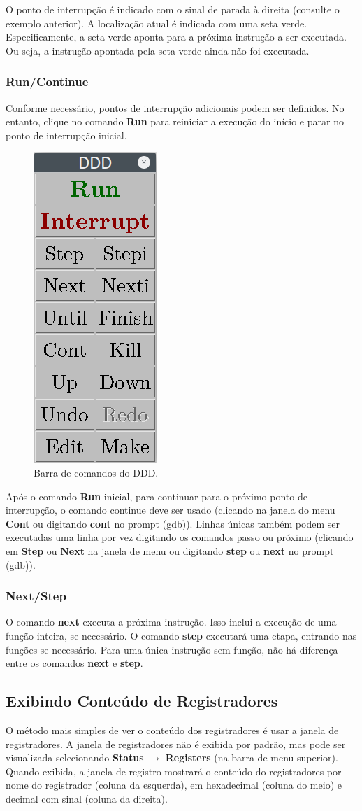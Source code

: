O ponto de interrupção é indicado com o sinal de parada à direita (consulte o exemplo anterior). A localização atual é indicada com uma seta verde. Especificamente, a seta verde aponta para a próxima instrução a ser executada. Ou seja, a instrução apontada pela seta verde ainda não foi executada.

\subsubsection{Run/Continue}
Conforme necessário, pontos de interrupção adicionais podem ser definidos. No entanto, clique no comando \textbf{Run} para reiniciar a execução do início e parar no ponto de interrupção inicial.

\begin{figure}[h]
	\begin{center}
		\includegraphics[width=0.12\linewidth]{imagens/ddd04}
	\end{center}
	\caption{Barra de comandos do DDD.}
\end{figure}

Após o comando \textbf{Run} inicial, para continuar para o próximo ponto de interrupção, o comando continue deve ser usado (clicando na janela do menu \textbf{Cont} ou digitando \textbf{cont} no prompt (gdb)). Linhas únicas também podem ser executadas uma linha por vez digitando os comandos passo ou próximo  (clicando em \textbf{Step} ou \textbf{Next} na janela de menu ou digitando \textbf{step} ou \textbf{next} no prompt (gdb)).


\subsubsection{Next/Step}
O comando \textbf{next} executa a próxima instrução. Isso inclui a execução de uma função inteira, se necessário. O comando \textbf{step} executará uma etapa, entrando nas funções se necessário. Para uma única instrução sem função, não há diferença entre os comandos \textbf{next} e \textbf{step}.

\subsection{Exibindo Conteúdo de Registradores}
O método mais simples de ver o conteúdo dos registradores é usar a janela de registradores. A janela de registradores não é exibida por padrão, mas pode ser visualizada selecionando \textbf{Status} $\rightarrow$ \textbf{Registers} (na barra de menu superior). Quando exibida, a janela de registro mostrará o conteúdo do registradores por nome do registrador (coluna da esquerda), em hexadecimal (coluna do meio) e decimal com sinal (coluna da direita).

